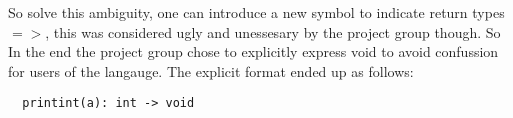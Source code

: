 So solve this ambiguity, one can introduce a new symbol to indicate return types $=>$, this was considered ugly and unessesary by the project group though. So In the end the project group chose to explicitly express void to avoid confussion for users of the langauge. The explicit format ended up as follows:
\begin{verbatim}
  printint(a): int -> void
\end{verbatim}
